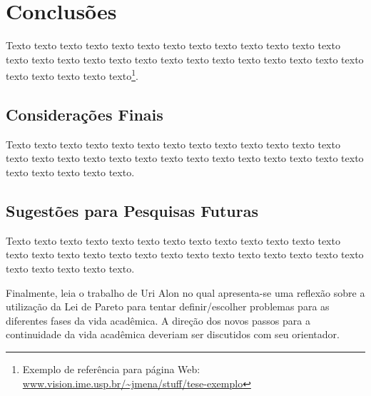 \chapter{Conclusões}
\label{cap:conclusoes}

Texto texto texto texto texto texto texto texto texto texto texto texto texto
texto texto texto texto texto texto texto texto texto texto texto texto texto
texto texto texto texto texto texto\footnote{Exemplo de referência para página
Web: \url{www.vision.ime.usp.br/~jmena/stuff/tese-exemplo}}.

\section{Considerações Finais} 

Texto texto texto texto texto texto texto texto texto texto texto texto texto
texto texto texto texto texto texto texto texto texto texto texto texto texto
texto texto texto texto texto texto. 

\section{Sugestões para Pesquisas Futuras} 

Texto texto texto texto texto texto texto texto texto texto texto texto texto
texto texto texto texto texto texto texto texto texto texto texto texto texto
texto texto texto texto texto texto.

Finalmente, leia o trabalho de Uri Alon \cite{alon09:how} no qual apresenta-se
uma reflexão sobre a utilização da Lei de Pareto para tentar definir/escolher
problemas para as diferentes fases da vida acadêmica.  A direção dos novos
passos para a continuidade da vida acadêmica deveriam ser discutidos com seu
orientador.
